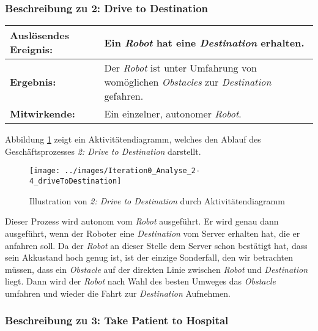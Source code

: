 			\subsubsection*{Beschreibung zu 2: Drive to Destination}

			\begin{table}[H]
				\centering
				\begin{tabularx}{\textwidth}{@{}p{3cm}X@{}}
				\hline
				\textbf{Auslösendes Ereignis:} & Ein \emph{Robot} hat eine \emph{Destination} erhalten.\\ \hline
				\textbf{Ergebnis:} & Der \emph{Robot} ist unter Umfahrung von womöglichen \emph{Obstacles} zur \emph{Destination} gefahren.\\ \hline
				\textbf{Mitwirkende:} &	Ein einzelner, autonomer \emph{Robot}. \\
				\hline
				\end{tabularx}
				\label{tab:2-4-drive-to-destination}
			\end{table}

			Abbildung \ref{fig:2-4-drive-to-destination-aktivitaetendiagramm} zeigt ein Aktivitätendiagramm, welches den Ablauf des Geschäftsprozesses \emph{2: Drive to Destination} darstellt.

			\begin{figure}[H]
				\centering
				\texttt{[image: ../images/Iteration0\_Analyse\_2-4\_driveToDestination]}
				\caption{Illustration von \emph{2: Drive to Destination} durch Aktivitätendiagramm}
				\label{fig:2-4-drive-to-destination-aktivitaetendiagramm}
			\end{figure}

			Dieser Prozess wird autonom vom \emph{Robot} ausgeführt. Er wird genau
			dann ausgeführt, wenn der Roboter eine \emph{Destination} vom Server
			erhalten hat, die er anfahren soll. Da der \emph{Robot} an dieser Stelle
			dem Server schon bestätigt hat, dass sein Akkustand hoch genug ist, ist
			der einzige Sonderfall, den wir betrachten müssen, dass ein
			\emph{Obstacle} auf der direkten Linie zwischen \emph{Robot} und
			\emph{Destination} liegt. Dann wird der \emph{Robot} nach Wahl des
			besten Umweges das \emph{Obstacle} umfahren und wieder die Fahrt zur
			\emph{Destination} Aufnehmen.



			\subsubsection*{Beschreibung zu 3: Take Patient to Hospital}

